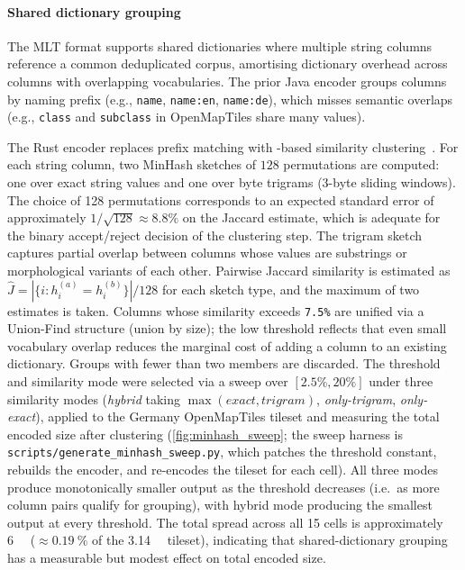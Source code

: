 \paragraph{Shared dictionary grouping}\label{sub_cardinality}
The \ac{MLT} format supports shared dictionaries where multiple string columns reference a common deduplicated corpus, amortising dictionary overhead across columns with overlapping vocabularies.
The prior Java encoder groups columns by naming prefix (e.g., \texttt{name}, \texttt{name:en}, \texttt{name:de}), which misses semantic overlaps (e.g., \texttt{class} and \texttt{subclass} in OpenMapTiles share many values).

\begin{sloppypar}
    The Rust encoder replaces prefix matching with -based similarity clustering~\cite{broderResemblanceContainmentDocuments1998}.
    For each string column, two MinHash sketches of $128$ permutations are computed: one over exact string values and one over byte trigrams (3-byte sliding windows).
    The choice of 128 permutations corresponds to an expected standard error of approximately $1/\sqrt{128} \approx 8.8\%$ on the Jaccard estimate, which is adequate for the binary accept/reject decision of the clustering step.
    The trigram sketch captures partial overlap between columns whose values are substrings or morphological variants of each other.
    Pairwise Jaccard similarity is estimated as $\hat{J} = |\{i : h_i^{(a)} = h_i^{(b)}\}| / 128$ for each sketch type, and the maximum of two estimates is taken.
    Columns whose similarity exceeds \texttt{7.5\%} are unified via a Union-Find structure (union by size); the low threshold reflects that even small vocabulary overlap reduces the marginal cost of adding a column to an existing dictionary.
    Groups with fewer than two members are discarded.
    The threshold and similarity mode were selected via a sweep over $[2.5\%, 20\%]$ under three similarity modes (\emph{hybrid} taking $\max(\textit{exact}, \textit{trigram})$, \emph{only-trigram}, \emph{only-exact}), applied to the Germany OpenMapTiles tileset and measuring the total encoded size after clustering (\cref{fig:minhash_sweep}; the sweep harness is \texttt{scripts/generate\_minhash\_sweep.py}, which patches the threshold constant, rebuilds the encoder, and re-encodes the tileset for each cell).
    All three modes produce monotonically smaller output as the threshold decreases (i.e.\ as more column pairs qualify for grouping), with hybrid mode producing the smallest output at every threshold.
    The total spread across all 15 cells is approximately \qty{6}{\mega\byte} ($\approx \qty{0.19}{\percent}$ of the \qty{3.14}{\giga\byte} tileset), indicating that shared-dictionary grouping has a measurable but modest effect on total encoded size.

\end{sloppypar}
